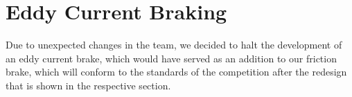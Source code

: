 \section{Eddy Current Braking}
Due to unexpected changes in the team, we decided to halt the development of an eddy current brake, which would have served as an addition to our friction brake, which will conform to the standards of the competition after the redesign that is shown in the respective section.
\newpage